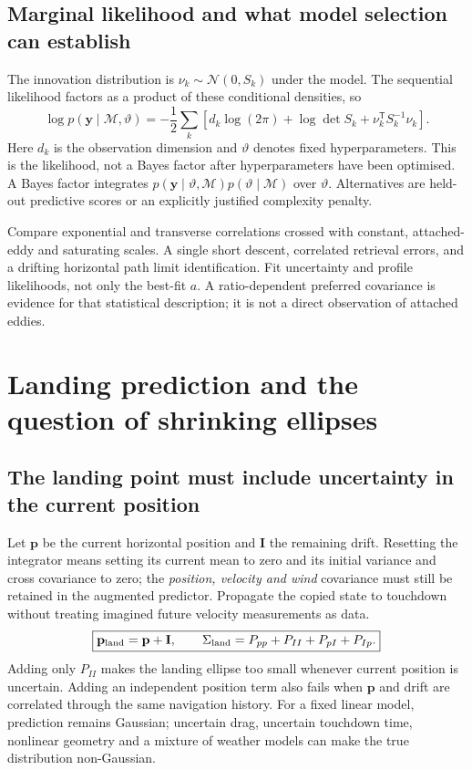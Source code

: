 \documentclass[11pt,a4paper]{article}
\numberwithin{equation}{section}
\begin{document}
\subsection{Marginal likelihood and what model selection can establish}
The innovation distribution is $\nu_k\sim\mathcal N(0,S_k)$ under the model. The sequential likelihood factors as a product of these conditional densities, so
\begin{equation}
 \log p(\mathbf y\mid\mathcal M,\vartheta)
 =-\frac12\sum_k\left[d_k\log(2\pi)+\log\det S_k+\nu_k^{\mathsf T}S_k^{-1}\nu_k\right].
\end{equation}
Here $d_k$ is the observation dimension and $\vartheta$ denotes fixed hyperparameters. This is the likelihood, not a Bayes factor after hyperparameters have been optimised. A Bayes factor integrates $p(\mathbf y\mid\vartheta,\mathcal M)p(\vartheta\mid\mathcal M)$ over $\vartheta$. Alternatives are held-out predictive scores or an explicitly justified complexity penalty.

Compare exponential and transverse correlations crossed with constant, attached-eddy and saturating scales. A single short descent, correlated retrieval errors, and a drifting horizontal path limit identification. Fit uncertainty and profile likelihoods, not only the best-fit $a$. A ratio-dependent preferred covariance is evidence for that statistical description; it is not a direct observation of attached eddies.

\section{Landing prediction and the question of shrinking ellipses}
\label{sec:landing}

\subsection{The landing point must include uncertainty in the current position}
Let $\mathbf p$ be the current horizontal position and $\mathbf I$ the remaining drift. Resetting the integrator means setting its current mean to zero and its initial variance and cross covariance to zero; the \emph{position, velocity and wind} covariance must still be retained in the augmented predictor. Propagate the copied state to touchdown without treating imagined future velocity measurements as data.
\begin{equation}
 \boxed{\mathbf p_{\rm land}=\mathbf p+\mathbf I,\qquad
 \Sigma_{\rm land}=P_{pp}+P_{II}+P_{pI}+P_{Ip}.}
\end{equation}
Adding only $P_{II}$ makes the landing ellipse too small whenever current position is uncertain. Adding an independent position term also fails when $\mathbf p$ and drift are correlated through the same navigation history. For a fixed linear model, prediction remains Gaussian; uncertain drag, uncertain touchdown time, nonlinear geometry and a mixture of weather models can make the true distribution non-Gaussian.
\end{document}
